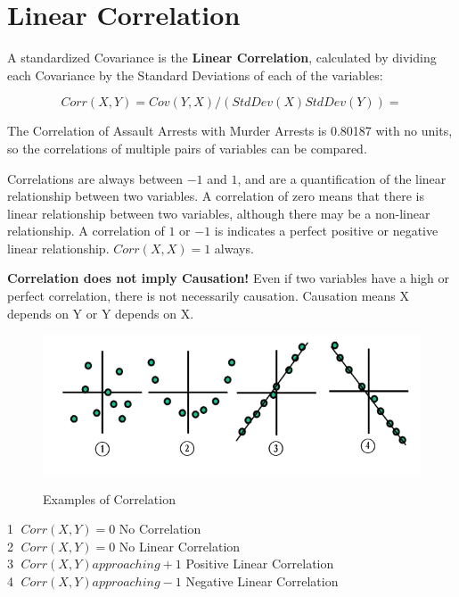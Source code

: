 \documentclass[nohyper,justified]{tufte-handout}\usepackage[]{graphicx}\usepackage[]{color}
\makeatletter
\def\maxwidth{ %
  \ifdim\Gin@nat@width>\linewidth
    \linewidth
  \else
    \Gin@nat@width
  \fi
}
\newenvironment{knitrout}{}{} %
\makeatother
\begin{document}
\newpage
\section{Linear Correlation}

A standardized Covariance is the \textbf{Linear Correlation}, calculated by dividing each Covariance by the Standard Deviations of each of the variables:

\begin{equation*}
Corr(X,Y)=Cov(Y,X)/(StdDev(X)StdDev(Y))=
\end{equation*}

The Correlation of Assault Arrests with Murder Arrests is 0.80187 with no units, so the correlations of multiple pairs of variables can be compared.

Correlations are always between $-1$ and $1$, and are a quantification of the linear relationship between two variables. A correlation of zero means that there is linear relationship between two variables, although there may be a non-linear relationship. A correlation of $1$ or $-1$ is indicates a perfect positive or negative linear relationship. $Corr(X,X)=1$ always.

\textbf{Correlation does not imply Causation!} Even if two variables have a high or perfect correlation, there is not necessarily causation. Causation means X depends on Y or Y depends on X. 

\begin{knitrout}
\color{fgcolor}
\begin{figure}
{\centering \includegraphics[width=\maxwidth]{Correlation_types-Language-neutral.png} 
}
\caption[Correlation Types]{Examples of Correlation }\label{fig:correlationtypes}
\end{figure}
\textcircled{1} $Corr(X,Y)=0$ No Correlation \\
\textcircled{2} $Corr(X,Y)=0$ No Linear Correlation \\
\textcircled{3} $Corr(X,Y) approaching +1$ Positive Linear Correlation \\
\textcircled{4} $Corr(X,Y) approaching -1$ Negative Linear Correlation\\
\end{knitrout}
\end{document}
